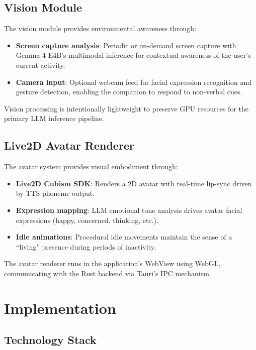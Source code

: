 \documentclass[sigconf]{acmart}
\begin{document}
\subsection{Vision Module}

The vision module provides environmental awareness through:

\begin{itemize}
    \item \textbf{Screen capture analysis}: Periodic or on-demand screen capture with Gemma 4 E4B's multimodal inference for contextual awareness of the user's current activity.
    \item \textbf{Camera input}: Optional webcam feed for facial expression recognition and gesture detection, enabling the companion to respond to non-verbal cues.
\end{itemize}

Vision processing is intentionally lightweight to preserve GPU resources for the primary LLM inference pipeline.

\subsection{Live2D Avatar Renderer}

The avatar system provides visual embodiment through:

\begin{itemize}
    \item \textbf{Live2D Cubism SDK}: Renders a 2D avatar with real-time lip-sync driven by TTS phoneme output.
    \item \textbf{Expression mapping}: LLM emotional tone analysis drives avatar facial expressions (happy, concerned, thinking, etc.).
    \item \textbf{Idle animations}: Procedural idle movements maintain the sense of a ``living'' presence during periods of inactivity.
\end{itemize}

The avatar renderer runs in the application's WebView using WebGL, communicating with the Rust backend via Tauri's IPC mechanism.

\section{Implementation}

\subsection{Technology Stack}
\end{document}
